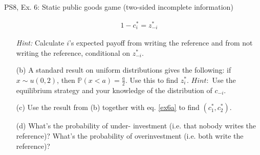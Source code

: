 \begin{frame}{PS8, Ex. 6: Static public goods game (two-sided incomplete information)}
\begin{multicols}{2}
\begin{itemize}
\begin{align}
        1-c_i^*=z_{-i}^*\label{ex6a}
      \end{align}
      \item[] \vspace{-8pt}\textit{Hint:} Calculate $i$'s expected payoff from writing the reference and from not writing the reference, conditional on $z_{-i}^*$.
      \item[(b)] A standard result on uniform distributions gives the following: if $x\sim u(0, 2)$, then $\mathbb{P}(x<a)=\frac{a}{2}$. Use this to find $z_i^*$. $Hint:$ Use the equilibrium strategy and your knowledge of the distribution of $c_{-i}$.
      \item[(c)] Use the result from (b) together with eq. \eqref{ex6a} to find $(c_1^* , c_2^*)$.
      \item[(d)] What’s the probability of under- investment (i.e. that nobody writes the reference)? What’s the probability of overinvestment (i.e. both write the reference)?
    \end{itemize}
    \vfill\null
  \end{multicols}
\end{frame}

